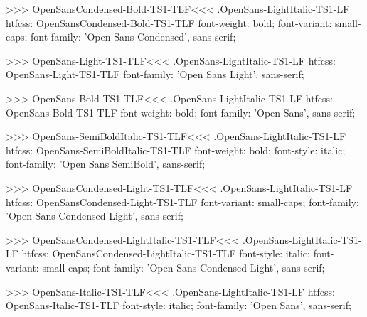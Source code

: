 >>>
\<OpenSansCondensed-Bold-TS1-TLF\><<<
.OpenSans-LightItalic-TS1-LF
htfcss:  OpenSansCondensed-Bold-TS1-TLF  font-weight: bold; font-variant: small-caps; font-family: 'Open Sans Condensed', sans-serif;

>>>
\<OpenSans-Light-TS1-TLF\><<<
.OpenSans-LightItalic-TS1-LF
htfcss:  OpenSans-Light-TS1-TLF  font-family: 'Open Sans Light', sans-serif;

>>>
\<OpenSans-Bold-TS1-TLF\><<<
.OpenSans-LightItalic-TS1-LF
htfcss:  OpenSans-Bold-TS1-TLF  font-weight: bold; font-family: 'Open Sans', sans-serif;

>>>
\<OpenSans-SemiBoldItalic-TS1-TLF\><<<
.OpenSans-LightItalic-TS1-LF
htfcss:  OpenSans-SemiBoldItalic-TS1-TLF  font-weight: bold; font-style: italic; font-family: 'Open Sans SemiBold', sans-serif;

>>>
\<OpenSansCondensed-Light-TS1-TLF\><<<
.OpenSans-LightItalic-TS1-LF
htfcss:  OpenSansCondensed-Light-TS1-TLF  font-variant: small-caps; font-family: 'Open Sans Condensed Light', sans-serif;

>>>
\<OpenSansCondensed-LightItalic-TS1-TLF\><<<
.OpenSans-LightItalic-TS1-LF
htfcss:  OpenSansCondensed-LightItalic-TS1-TLF  font-style: italic; font-variant: small-caps; font-family: 'Open Sans Condensed Light', sans-serif;

>>>
\<OpenSans-Italic-TS1-TLF\><<<
.OpenSans-LightItalic-TS1-LF
htfcss:  OpenSans-Italic-TS1-TLF  font-style: italic; font-family: 'Open Sans', sans-serif;

